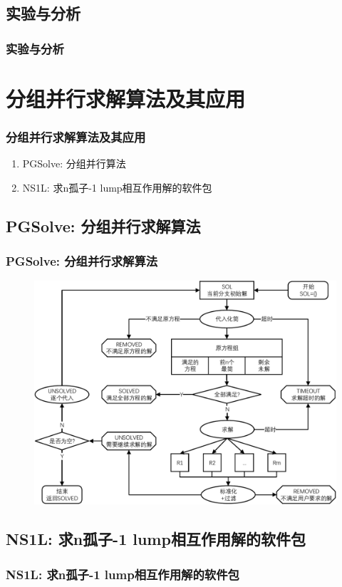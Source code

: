\documentclass[serif]{beamer}
\begin{document}
\subsection{实验与分析}
\begin{frame}
\frametitle{实验与分析}
\end{frame}

\section{分组并行求解算法及其应用}
\begin{frame}
\frametitle{分组并行求解算法及其应用}
\begin{enumerate}
\item PGSolve: 分组并行算法
\item NS1L: 求n孤子-1 lump相互作用解的软件包
\end{enumerate}
\end{frame}

\subsection{PGSolve: 分组并行求解算法}
\begin{frame}
\frametitle{PGSolve: 分组并行求解算法}
\begin{figure}
\centering
\includegraphics[height=0.8\textheight]{../paper/fig/pgsolve.pdf}
\end{figure}
\end{frame}

\subsection{NS1L: 求n孤子-1 lump相互作用解的软件包}
\begin{frame}
\frametitle{NS1L: 求n孤子-1 lump相互作用解的软件包}
\end{frame}
\end{document}
